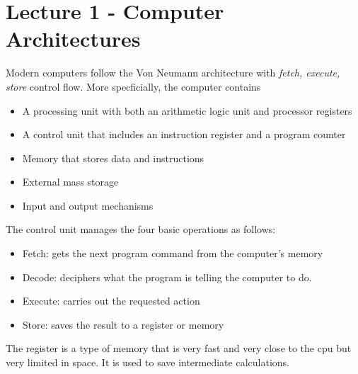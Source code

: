 \documentclass{article}
\begin{document}
\section*{Lecture 1 - Computer Architectures}
\indent Modern computers follow the Von Neumann architecture with \textit{fetch, execute, store} control flow. 
More specficially, the computer contains
\begin{itemize}
    \item A processing unit with both an arithmetic logic unit  and processor registers
    \item A control unit that includes an instruction register and a program counter
    \item Memory that stores data and instructions
    \item External mass storage
    \item Input and output mechanisms
\end{itemize}
The control unit manages the four basic operations as follows:
\begin{itemize}
    \item Fetch: gets the next program command from the computer's memory
    \item Decode: deciphers what the program is telling the computer to do.
    \item Execute: carries out the requested action
    \item Store: saves the result to a register or memory
\end{itemize}
The register is a type of memory that is very fast and very close to the cpu but very limited in space. It is used to save intermediate calculations. 
\end{document}
